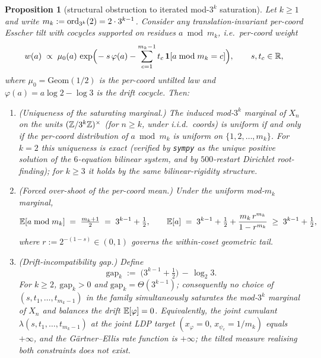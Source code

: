 \documentclass[11pt]{amsart}
\newtheorem{proposition}[theorem]{Proposition}
\theoremstyle{definition}
\theoremstyle{remark}
\begin{document}
\begin{proposition}[structural obstruction to iterated mod-$3^k$ saturation]\label{prop:dimbarrier}
Let $k\ge1$ and write $m_k:=\operatorname{ord}_{3^k}(2)=2\cdot 3^{k-1}$. Consider any translation-invariant per-coord
Esscher tilt with cocycles supported on residues $a\bmod m_k$, i.e.\ per-coord weight
\[
  w(a)\;\propto\;\mu_0(a)\,\exp\!\Big(\!-s\,\varphi(a)-\sum_{c=1}^{m_k-1} t_c\,\mathbf{1}[a\bmod m_k=c]\Big),
  \qquad s,t_c\in\mathbb{R},
\]
where $\mu_0=\mathrm{Geom}(1/2)$ is the per-coord untilted law and $\varphi(a)=a\log 2-\log 3$ is the
drift cocycle. Then:
\begin{enumerate}[label=\textup{(\arabic*)},leftmargin=*]
\item \textup{(Uniqueness of the saturating marginal.)} The induced mod-$3^k$ marginal of $X_n$ on the
units $(\mathbb{Z}/3^{k}\mathbb{Z})^{\times}$ (for $n\ge k$, under i.i.d.\ coords) is uniform if and only if the per-coord
distribution of $a\bmod m_k$ is uniform on $\{1,2,\dots,m_k\}$. For $k=2$ this uniqueness is exact
(verified by \texttt{sympy} as the unique positive solution of the $6$-equation bilinear system, and
by $500$-restart Dirichlet root-finding); for $k\ge 3$ it holds by the same bilinear-rigidity
structure.
\item \textup{(Forced over-shoot of the per-coord mean.)} Under the uniform mod-$m_k$ marginal,
\[
  \mathbb{E}[a\bmod m_k]\;=\;\tfrac{m_k+1}{2}\;=\;3^{k-1}+\tfrac12,
\qquad
  \mathbb{E}[a]\;=\;3^{k-1}+\tfrac12+\frac{m_k\,r^{m_k}}{1-r^{m_k}}\;\ge\;3^{k-1}+\tfrac12,
\]
where $r:=2^{-(1-s)}\in(0,1)$ governs the within-coset geometric tail.
\item \textup{(Drift-incompatibility gap.)} Define
\[
  \mathrm{gap}_k\;:=\;\bigl(3^{k-1}+\tfrac12\bigr)\,-\,\log_2 3.
\]
For $k\ge 2$, $\mathrm{gap}_k>0$ and $\mathrm{gap}_k=\Theta(3^{k-1})$; consequently no choice of
$(s,t_1,\dots,t_{m_k-1})$ in the family simultaneously saturates the mod-$3^k$ marginal of $X_n$ and
balances the drift $\mathbb{E}[\varphi]=0$. Equivalently, the joint cumulant
$\lambda(s,t_1,\dots,t_{m_k-1})$ at the joint LDP target $(x_\varphi=0,\,x_{\psi_c}=1/m_k)$ equals
$+\infty$, and the Gärtner--Ellis rate function is $+\infty$; the tilted measure realising both
constraints does not exist.
\end{enumerate}
\end{proposition}
\end{document}
